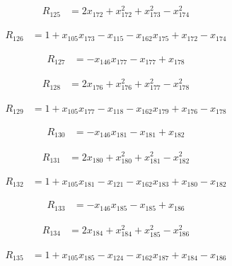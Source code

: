 \begin{align*}
R_{125} &= 2 x_{172} +x_{172}^{2} +x_{173}^{2} -x_{174}^{2}
\end{align*}

\begin{align*}
R_{126} &= 1 +x_{105} x_{173} -x_{115} -x_{162} x_{175} +x_{172} -x_{174}
\end{align*}

\begin{align*}
R_{127} &= -x_{146} x_{177} -x_{177} +x_{178}
\end{align*}

\begin{align*}
R_{128} &= 2 x_{176} +x_{176}^{2} +x_{177}^{2} -x_{178}^{2}
\end{align*}

\begin{align*}
R_{129} &= 1 +x_{105} x_{177} -x_{118} -x_{162} x_{179} +x_{176} -x_{178}
\end{align*}

\begin{align*}
R_{130} &= -x_{146} x_{181} -x_{181} +x_{182}
\end{align*}

\begin{align*}
R_{131} &= 2 x_{180} +x_{180}^{2} +x_{181}^{2} -x_{182}^{2}
\end{align*}

\begin{align*}
R_{132} &= 1 +x_{105} x_{181} -x_{121} -x_{162} x_{183} +x_{180} -x_{182}
\end{align*}

\begin{align*}
R_{133} &= -x_{146} x_{185} -x_{185} +x_{186}
\end{align*}

\begin{align*}
R_{134} &= 2 x_{184} +x_{184}^{2} +x_{185}^{2} -x_{186}^{2}
\end{align*}

\begin{align*}
R_{135} &= 1 +x_{105} x_{185} -x_{124} -x_{162} x_{187} +x_{184} -x_{186}
\end{align*}

